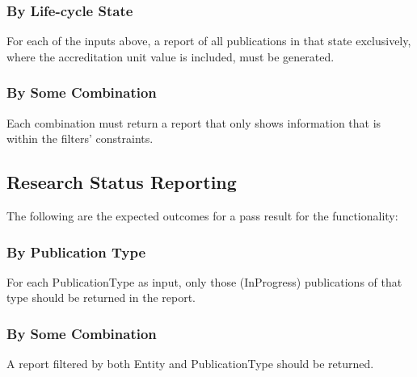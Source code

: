 \subsubsection{By Life-cycle State}
For each of the inputs above, a report of all publications in that state exclusively, where the accreditation unit value is included, must be generated.

\subsubsection{By Some Combination}
Each combination must return a report that only shows information that is within the filters' constraints.

\subsection{Research Status Reporting}
The following are the expected outcomes for a pass result for the functionality:

\subsubsection{By Publication Type} \label{ti_sr_pubtype}
For each PublicationType as input, only those (InProgress) publications of that type should be returned in the report.

\subsubsection{By Some Combination }
A report filtered by both Entity and PublicationType should be returned.



